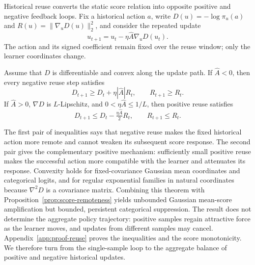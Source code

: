 Historical reuse converts the static score relation into opposite positive and negative feedback loops. Fix a historical action $a$, write $D(u)=-\log\pi_u(a)$ and $R(u)=\|\nabla_uD(u)\|_2^2$, and consider the repeated update
\begin{equation}
u_{t+1}=u_t-\eta\widehat A\nabla_uD(u_t).
\label{eq:reuse-update}
\end{equation}
The action and its signed coefficient remain fixed over the reuse window; only the learner coordinates change.
\begin{theorem}
\label{thm:reuse}
Assume that $D$ is differentiable and convex along the update path. If $\widehat A<0$, then every negative reuse step satisfies
\begin{equation}
D_{t+1}\ge D_t+\eta|\widehat A|R_t,
\qquad R_{t+1}\ge R_t.
\end{equation}
If $\widehat A>0$, $\nabla D$ is $L$-Lipschitz, and $0<\eta\widehat A\le1/L$, then positive reuse satisfies
\begin{equation}
D_{t+1}\le D_t-\tfrac{\eta\widehat A}{2}R_t,
\qquad R_{t+1}\le R_t.
\end{equation}
\end{theorem}
The first pair of inequalities says that negative reuse makes the fixed historical action more remote and cannot weaken its subsequent score response. The second pair gives the complementary positive mechanism: sufficiently small positive reuse makes the successful action more compatible with the learner and attenuates its response. Convexity holds for fixed-covariance Gaussian mean coordinates and categorical logits, and for regular exponential families in natural coordinates because $\nabla^2D$ is a covariance matrix. Combining this theorem with Proposition~\ref{prop:score-remoteness} yields unbounded Gaussian mean-score amplification but bounded, persistent categorical suppression. The result does not determine the aggregate policy trajectory: positive samples regain attractive force as the learner moves, and updates from different samples may cancel. Appendix~\ref{app:proof-reuse} proves the inequalities and the score monotonicity. We therefore turn from the single-sample loop to the aggregate balance of positive and negative historical updates.

